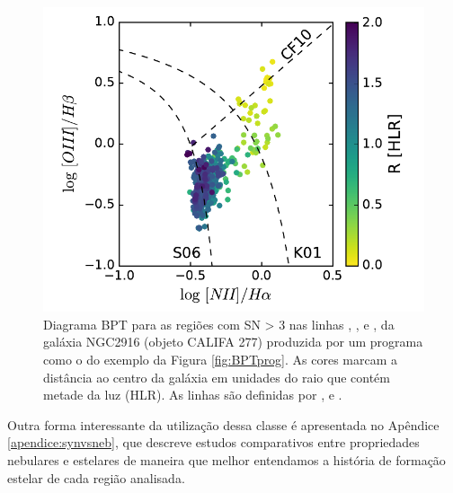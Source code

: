 \begin{figure}
	\centering
	\includegraphics[scale=0.6]{figuras/K0277-BPT.pdf}
	\caption[Diagrama BPT da galáxia NGC2916]
	{Diagrama BPT para as regiões com SN > 3 nas linhas \Hb, \OIII, \Ha e \NII, da galáxia
NGC2916 (objeto CALIFA 277) produzida por um programa como o do exemplo da Figura \ref{fig:BPTprog}.
As cores marcam a distância ao centro da galáxia em unidades do raio que contém metade da luz (HLR). As
linhas são definidas por \citet[][K01]{Kewley.etal.2001a}, \citet[][S06]{Stasinska.etal.2006a} e
\citet[][CF10]{CidFernandes.etal.2010a}.}
	\label{fig:BPTfig}
\end{figure}

Outra forma interessante da utilização dessa classe é apresentada no Apêndice \ref{apendice:synvsneb}, que descreve estudos comparativos entre propriedades nebulares e estelares de maneira que melhor entendamos a história de formação estelar de cada região analisada.


